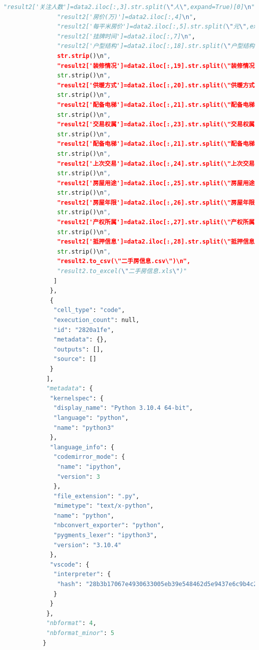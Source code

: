 \documentclass[withoutpreface,bwprint]{cumcmthesis} %
\begin{document}
\begin{appendices}
\begin{lstlisting}[language=Python]
               "result2['关注人数']=data2.iloc[:,3].str.split(\"人\",expand=True)[0]\n",
               "result2['房价(万)']=data2.iloc[:,4]\n",
               "result2['每平米房价']=data2.iloc[:,5].str.split(\"元\",expand=True)[0]\n",
               "result2['挂牌时间']=data2.iloc[:,7]\n",
               "result2['户型结构']=data2.iloc[:,18].str.split(\"户型结构\",expand=True)[1].
               str.strip()\n",
               "result2['装修情况']=data2.iloc[:,19].str.split(\"装修情况\",expand=True)[1].
               str.strip()\n",
               "result2['供暖方式']=data2.iloc[:,20].str.split(\"供暖方式\",expand=True)[1].
               str.strip()\n",
               "result2['配备电梯']=data2.iloc[:,21].str.split(\"配备电梯\",expand=True)[1].
               str.strip()\n",
               "result2['交易权属']=data2.iloc[:,23].str.split(\"交易权属\",expand=True)[1].
               str.strip()\n",
               "result2['配备电梯']=data2.iloc[:,21].str.split(\"配备电梯\",expand=True)[1].
               str.strip()\n",
               "result2['上次交易']=data2.iloc[:,24].str.split(\"上次交易\",expand=True)[1].
               str.strip()\n",
               "result2['房屋用途']=data2.iloc[:,25].str.split(\"房屋用途\",expand=True)[1].
               str.strip()\n",
               "result2['房屋年限']=data2.iloc[:,26].str.split(\"房屋年限\",expand=True)[1].
               str.strip()\n",
               "result2['产权所属']=data2.iloc[:,27].str.split(\"产权所属\",expand=True)[1].
               str.strip()\n",
               "result2['抵押信息']=data2.iloc[:,28].str.split(\"抵押信息\",expand=True)[1].
               str.strip()\n",
               "result2.to_csv(\"二手房信息.csv\")\n",
               "result2.to_excel(\"二手房信息.xls\")"
              ]
             },
             {
              "cell_type": "code",
              "execution_count": null,
              "id": "2820a1fe",
              "metadata": {},
              "outputs": [],
              "source": []
             }
            ],
            "metadata": {
             "kernelspec": {
              "display_name": "Python 3.10.4 64-bit",
              "language": "python",
              "name": "python3"
             },
             "language_info": {
              "codemirror_mode": {
               "name": "ipython",
               "version": 3
              },
              "file_extension": ".py",
              "mimetype": "text/x-python",
              "name": "python",
              "nbconvert_exporter": "python",
              "pygments_lexer": "ipython3",
              "version": "3.10.4"
             },
             "vscode": {
              "interpreter": {
               "hash": "28b3b17067e4930633005eb39e548462d5e9437e6c9b4c2b70295c23a85f602c"
              }
             }
            },
            "nbformat": 4,
            "nbformat_minor": 5
           }           
    \end{lstlisting}
\end{appendices}
\end{document}

